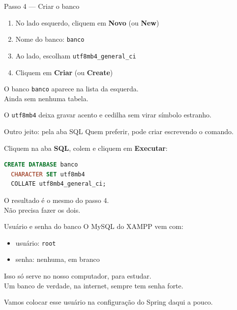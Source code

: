 \documentclass[aspectratio=169,11pt]{beamer}
\begin{document}
\begin{frame}{Passo 4 --- Criar o banco}
  \begin{enumerate}
    \item No lado esquerdo, cliquem em \textbf{Novo} (ou \textbf{New})
    \item Nome do banco: \texttt{banco}
    \item Ao lado, escolham \texttt{utf8mb4\_general\_ci}
    \item Cliquem em \textbf{Criar} (ou \textbf{Create})
  \end{enumerate}

  \vspace{0.5em}
  O banco \texttt{banco} aparece na lista da esquerda.\\
  Ainda sem nenhuma tabela.

  \vspace{0.5em}
  O \texttt{utf8mb4} deixa gravar acento e cedilha sem virar símbolo estranho.
\end{frame}

\begin{frame}[fragile]{Outro jeito: pela aba SQL}
  Quem preferir, pode criar escrevendo o comando.

  \vspace{0.4em}
  Cliquem na aba \textbf{SQL}, colem e cliquem em \textbf{Executar}:

\begin{lstlisting}[language=SQL,basicstyle=\ttfamily\footnotesize]
CREATE DATABASE banco
  CHARACTER SET utf8mb4
  COLLATE utf8mb4_general_ci;
\end{lstlisting}

  \vspace{0.4em}
  O resultado é o mesmo do passo 4.\\
  Não precisa fazer os dois.
\end{frame}

\begin{frame}{Usuário e senha do banco}
  O MySQL do XAMPP vem com:

  \vspace{0.4em}
  \begin{itemize}
    \item usuário: \texttt{root}
    \item senha: nenhuma, em branco
  \end{itemize}

  \vspace{0.5em}
  Isso só serve no nosso computador, para estudar.\\
  Um banco de verdade, na internet, sempre tem senha forte.

  \vspace{0.5em}
  Vamos colocar esse usuário na configuração do Spring daqui a pouco.
\end{frame}
\end{document}

